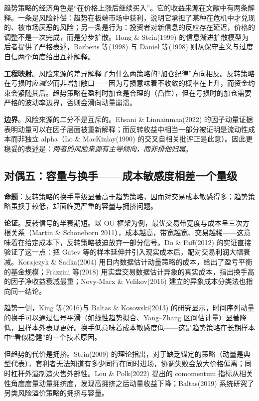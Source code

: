趋势策略的经济角色是“在价格上涨后继续买入”。它的收益来源在文献中有两条解释。一条是风险补偿：趋势在极端市场中获利，说明它承担了某种在危机中才兑现的、被市场厌恶的风险\cite{hop2017}；另一条是行为：投资者对新信息的反应存在延迟，价格的调整不是一次完成，而是分步扩散。Hong \& Stein(1999) 的信息渐进扩散模型为后者提供了严格表述\cite{hongstein1999}，Barberis 等(1998) 与 Daniel 等(1998) 则从保守主义与过度自信两个角度给出互补解释\cite{bsv1998,dhs1998}。

\textbf{工程映射}。风险来源的差异解释了为什么两策略的“加仓纪律”方向相反。反转策略在亏损时应\emph{减少}而非增加敞口——因为亏损意味着不收敛的概率在上升，而资金约束会紧随其后。趋势策略在盈利时加仓是合理的（凸性），但在亏损时的加仓需要严格的波动率边界，否则会滑向动量崩溃。

\textbf{边界}。风险来源的二分不是互斥的。Ehsani \& Linnainmaa(2022) 的因子动量证据表明动量可以在因子层面被重新解释\cite{ehsani2022}；而反转收益中相当一部分被证明是流动性成本而非独立 alpha（Lo \& MacKinlay(1990) 的交叉自相关批评正是此意）\cite{lomackinlay1990}。因此更稳妥的表述是：\emph{两者的风险来源有主导倾向，而非排他归属}。

\subsection{对偶五：容量与换手——成本敏感度相差一个量级}

\textbf{命题}：反转策略的换手量级显著高于趋势策略，因而对交易成本敏感得多；趋势策略虽换手较低，却面临更严重的容量与拥挤问题。

\textbf{论证}。反转信号的半衰期短。以 OU 框架为例，最优交易带宽度与成本呈三次方根关系（Martin \& Sch\"oneborn 2011\cite{martin2011}），成本越高，带宽越宽、交易越稀——这意味着在给定成本下，反转策略被迫放弃一部分信号。Do \& Faff(2012) 的实证直接验证了这一点：把 Gatev 等的样本延伸并引入现实成本后，配对交易利润大幅衰减\cite{dofaff2012}。Korajczyk \& Sadka(2004) 用日内数据估计动量策略的成本，给出了盈亏平衡的基金规模\cite{korajczyksadka2004}；Frazzini 等(2018) 用实盘交易数据估计异象的真实成本，指出换手高的因子净收益衰减最重\cite{frazzini2018}；Novy-Marx \& Velikov(2016) 建立的异象成本分类法也指向同一结论\cite{novymarxvelikov2016}。

趋势一侧，King 等(2016)\cite{kim2016}与 Baltas \& Kosowski(2013) 的研究显示，时间序列动量的换手可以通过信号平滑（如线性趋势拟合、Yang--Zhang 区间估计量）显著降低，且样本外表现更好。换手低意味着成本敏感度低——这是趋势策略在长期样本中“看似稳健”的一个技术原因。

但趋势的代价是拥挤。Stein(2009) 的理论指出，对于缺乏锚定的策略（动量是典型代表），套利者无法知道有多少同行在同时进场，协调失败会放大价格偏离；同时杠杆外溢制造火售外部性\cite{stein2009}。Lou \& Polk(2022) 提出的 comomentum 指标从相关性角度度量动量拥挤度，发现高拥挤之后动量收益下降\cite{loupolk2022}；Baltas(2019) 系统研究了另类风险溢价策略的拥挤与容量\cite{baltas2019}。

